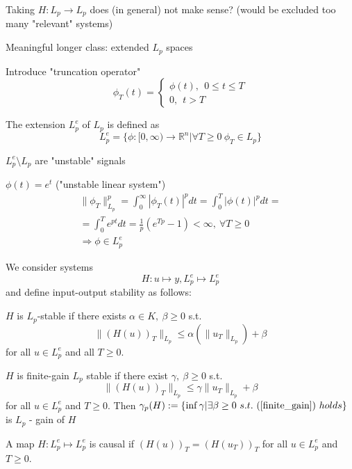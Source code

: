 Taking $H: L_p \to L_p$ does (in general) not make sense? (would be excluded too many "relevant" systems)

Meaningful longer class: extended $L_p$ spaces

Introduce "truncation operator"
\begin{equation*}
\phi_T(t) = \left\{
                \begin{array}{ll}
                  \phi (t), \ \ 0 \leq t \leq T\\
                  0, \ \ t > T
                \end{array}
              \right. 
\end{equation*}

The extension $L^e_p$ of $L_p$ is defined as 
\begin{equation*}
L^e_p = \{ \phi: [0,\infty) \to \mathbb{R}^n | \forall T \geq 0 \ \phi_T \in L_p\}
\end{equation*}

$L^e_p \setminus L_p$ are "unstable" signals

\begin{Example}
$\phi (t) = e^t $ ("unstable linear system")
\begin{equation*}
\begin{split}
\|\phi_T\|^p_{L_p} = \int_0^{\infty} |\phi_T(t)|^pdt = \int_0^T|\phi(t)|^pdt =  \\
= \int_0^Te^{pt}dt = \frac{1}{p}(e^{Tp} - 1) < \infty, \ \forall T \geq 0 \\
\Rightarrow \phi \in L_p^e 
\end{split}
\end{equation*}
\end{Example}

We consider systems 
\begin{equation*}
H: u \mapsto y, L_p^e \mapsto L_p^e
\end{equation*}
and define input-output stability as follows:
\begin{Definition}
$H$ is $L_p$-stable if there exists $\alpha \in K, \ \beta \geq 0$ s.t. 
\begin{equation*}
\|(H(u))_T\|_{L_p} \leq \alpha (\|u_T\|_{L_p}) + \beta
\end{equation*}
for all $u \in L^e_p$ and all $T \geq 0$. 

$H$ is finite-gain $L_p$ stable if there exist $\gamma, \ \beta \geq 0$ s.t. 
\begin{equation}\label{finite_gain}
\|(H(u))_T\|_{L_p} \leq \gamma \|u_T\|_{L_p} + \beta 
\end{equation}
for all $u \in L_p^e$ and $T \geq 0$. Then $\gamma_p(H) := \{ \inf \gamma | \exists \beta \geq 0\ s.t.\ (\ref{finite_gain})\ holds\}$ is $L_p$ - gain of $H$
\end{Definition}
\begin{Definition}
A map $H: L_p^e \mapsto L_p^e$ is causal if $(H(u))_T = (H(u_T))_T$ for all $u \in L_p^e$ and $T \geq 0$. 
\end{Definition}

